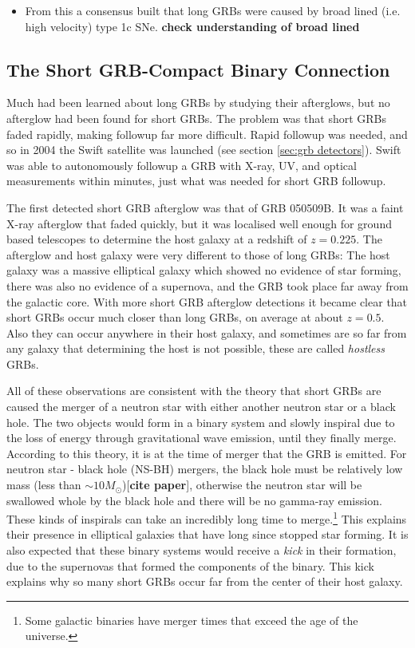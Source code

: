 \documentclass[11pt]{cuthesis}
\begin{document}
\begin{itemize}
\item From this a consensus built that long GRBs were caused by broad lined (i.e. high velocity) type 1c SNe. \textbf{check understanding of broad lined} 
\end{itemize}


\subsection{The Short GRB-Compact Binary Connection}
Much had been learned about long GRBs by studying their afterglows, but no afterglow had been found for short GRBs. The problem was that short GRBs faded rapidly, making followup far more difficult. Rapid followup was needed, and so in 2004 the Swift satellite was launched (see section \ref{sec:grb detectors}). Swift was able to autonomously followup a GRB with X-ray, UV, and optical measurements within minutes, just what was needed for short GRB followup. 

The first detected short GRB afterglow was that of GRB 050509B. It was a faint X-ray afterglow that faded quickly, but it was localised well enough for ground based telescopes to determine the host galaxy at a redshift of $z=0.225$. The afterglow and host galaxy were very different to those of long GRBs: The host galaxy was a massive elliptical galaxy which showed no evidence of star forming, there was also no evidence of a supernova, and the GRB took place far away from the galactic core. With more short GRB afterglow detections it became clear that short GRBs occur much closer than long GRBs, on average at about $z=0.5$. Also they can occur anywhere in their host galaxy, and sometimes are so far from any galaxy that determining the host is not possible, these are called \textit{hostless} GRBs.

All of these observations are consistent with the theory that short GRBs are caused the merger of a neutron star with either another neutron star or a black hole. The two objects would form in a binary system and slowly inspiral due to the loss of energy through gravitational wave emission, until they finally merge. According to this theory, it is at the time of merger that the GRB is emitted. For neutron star - black hole (NS-BH) mergers, the black hole must be relatively low mass (less than $\sim 10M_\odot$)[\textbf{cite paper}], otherwise the neutron star will be swallowed whole by the black hole and there will be no gamma-ray emission. These kinds of inspirals can take an incredibly long time to merge.\footnote{Some galactic binaries have merger times that exceed the age of the universe.} This explains their presence in elliptical galaxies that have long since stopped star forming. It is also expected that these binary systems would receive a \textit{kick} in their formation, due to the supernovas that formed the components of the binary. This kick explains why so many short GRBs occur far from the center of their host galaxy. 
\end{document}
